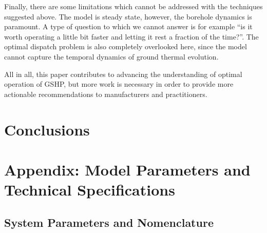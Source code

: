 \documentclass[journal=iecr,manuscript=]{achemso}
\begin{document}
Finally, there are some limitations which cannot be addressed with the
techniques suggested above. The model is steady state, however, the
borehole dynamics is paramount. A type of question to which we cannot
answer is for example ``is it worth operating a little bit faster and
letting it rest a fraction of the time?''. The optimal dispatch problem
is also completely overlooked here, since the model cannot capture the
temporal dynamics of ground thermal evolution.

All in all, this paper contributes to advancing the understanding of
optimal operation of GSHP, but more work is necessary in order to
provide more actionable recommendations to manufacturers and
practitioners.

\section{Conclusions}\label{conclusions}

\section{Appendix: Model Parameters and Technical
Specifications}\label{sec-appendix-parameters}

\subsection{System Parameters and
Nomenclature}\label{system-parameters-and-nomenclature}
\end{document}
